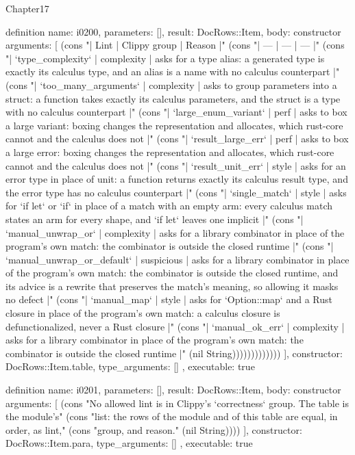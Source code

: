 \begin{lexlean}{Chapter17}
\begin{semanticmodule}
definition{
  name: i0200,
  parameters: [],
  result: DocRows::Item,
  body: constructor{
    arguments: [
      (cons "| Lint | Clippy group | Reason |" (cons "| --- | --- | --- |" (cons "| `type_complexity` | complexity | asks for a type alias: a generated type is exactly its calculus type, and an alias is a name with no calculus counterpart |" (cons "| `too_many_arguments` | complexity | asks to group parameters into a struct: a function takes exactly its calculus parameters, and the struct is a type with no calculus counterpart |" (cons "| `large_enum_variant` | perf | asks to box a large variant: boxing changes the representation and allocates, which rust-core cannot and the calculus does not |" (cons "| `result_large_err` | perf | asks to box a large error: boxing changes the representation and allocates, which rust-core cannot and the calculus does not |" (cons "| `result_unit_err` | style | asks for an error type in place of unit: a function returns exactly its calculus result type, and the error type has no calculus counterpart |" (cons "| `single_match` | style | asks for `if let` or `if` in place of a match with an empty arm: every calculus match states an arm for every shape, and `if let` leaves one implicit |" (cons "| `manual_unwrap_or` | complexity | asks for a library combinator in place of the program's own match: the combinator is outside the closed runtime |" (cons "| `manual_unwrap_or_default` | suspicious | asks for a library combinator in place of the program's own match: the combinator is outside the closed runtime, and its advice is a rewrite that preserves the match's meaning, so allowing it masks no defect |" (cons "| `manual_map` | style | asks for `Option::map` and a Rust closure in place of the program's own match: a calculus closure is defunctionalized, never a Rust closure |" (cons "| `manual_ok_err` | complexity | asks for a library combinator in place of the program's own match: the combinator is outside the closed runtime |" (nil String)))))))))))))
    ],
    constructor: DocRows::Item.table,
    type_arguments: []
  },
  executable: true
}

definition{
  name: i0201,
  parameters: [],
  result: DocRows::Item,
  body: constructor{
    arguments: [
      (cons "No allowed lint is in Clippy's `correctness` group. The table is the module's" (cons "list: the rows of the module and of this table are equal, in order, as lint," (cons "group, and reason." (nil String))))
    ],
    constructor: DocRows::Item.para,
    type_arguments: []
  },
  executable: true
}


\end{semanticmodule}
\end{lexlean}
